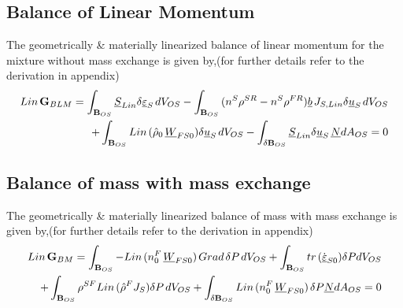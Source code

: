\documentclass[12pt]{article}
\begin{document}
\subsection{Balance of Linear Momentum}
\vspace{2mm}
The geometrically & materially linearized balance of linear momentum for the mixture without mass exchange is given by,(for further details refer to the derivation in appendix)
\begin{equation}
	\begin{aligned}
		Lin\hspace{0.5mm}{\mathbf{G}_{BLM}}=\int_{\mathbf{B}_{OS}}{\underline{S}_{Lin}}{\delta \underline{\varepsilon}_S}\hspace{0.5mm}{d{V_{OS}}}
		-\int_{\mathbf{B}_{OS}}{({{n^S}{\rho^{SR}}-{{n^S}{\rho^{FR}}}){\underline{b}}\hspace{0.5mm}{J_{S,Lin}}{\delta {\underline{u}}_{S}}\hspace{0.5mm}{d{V_{OS}}}}}\\
		+ \int_{\mathbf{B}_{OS}}{Lin\hspace{0.5mm}({\hat{\rho}}_{0}\hspace{0.5mm}{\underline{W}_{FS0}})}{\delta {\underline{u}}_{S}}\hspace{0.5mm}{d{V_{OS}}}
		- \int_{\mathbf{\delta B}_{OS}}{\underline{S}_{Lin}}{\delta \underline{u}_S}\hspace{0.5mm}{\underline{N}}{d{A_{OS}}} = 0
	\end{aligned}
\end{equation}

\subsection{Balance of mass with mass exchange}
\vspace{5mm}
The geometrically & materially linearized balance of mass with mass exchange is given by,(for further details refer to the derivation in appendix)
\begin{equation}
	\begin{aligned}
		Lin\hspace{0.5mm}{\mathbf{G}_{BM}}=\int_{\mathbf{B}_{OS}}{-{Lin\hspace{0.5mm}({n_{0}^{F}}\hspace{0.5mm}{\underline{W}_{FS0}})}\hspace{0.5mm}{Grad\hspace{0.5mm}\delta P}\hspace{0.5mm}{d{V_{OS}}}} + \int_{\mathbf{B}_{OS}}{tr\hspace{0.5mm}(\Dot{\underline{\varepsilon}}_{S0})}{\delta P}{d{V_{OS}}}\\ 
		+ \int_{\mathbf{B}_{OS}}{\rho^{SF}}{Lin\hspace{0.5mm}{({\hat{\rho}^{F}}{J_{S}})}}{\delta P}\hspace{0.5mm}{d{V_{OS}}}+ \int_{\mathbf{\delta B}_{OS}}{Lin\hspace{0.5mm}(n^{F}_{0}\hspace{0.5mm}{\underline{W}_{FS0}})}\hspace{0.5mm}{\delta P}{\underline{N}}{d{A_{OS}}} = 0
	\end{aligned}
\end{equation}
\end{document}
